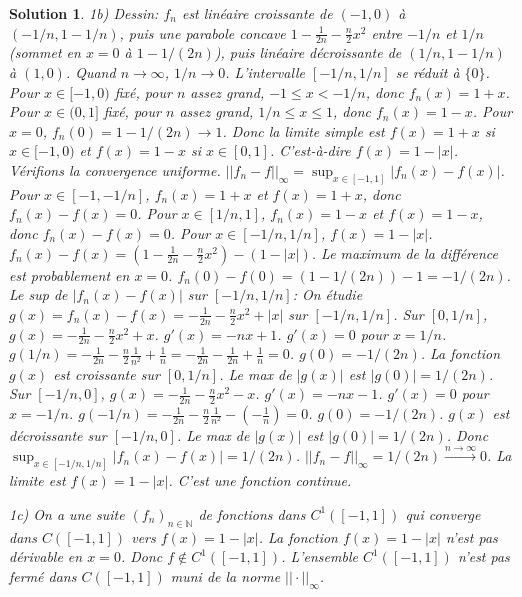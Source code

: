 \documentclass{article}
\newtheorem{solution}{Solution}
\begin{document}
\begin{solution}
1b) Dessin: $f_n$ est linéaire croissante de $(-1,0)$ à $(-1/n, 1-1/n)$, puis une parabole concave $1-\frac{1}{2n} - \frac{n}{2}x^2$ entre $-1/n$ et $1/n$ (sommet en $x=0$ à $1-1/(2n)$), puis linéaire décroissante de $(1/n, 1-1/n)$ à $(1,0)$. Quand $n \to \infty$, $1/n \to 0$. L'intervalle $[-1/n, 1/n]$ se réduit à $\{0\}$.
Pour $x \in [-1, 0)$ fixé, pour $n$ assez grand, $-1 \le x < -1/n$, donc $f_n(x) = 1+x$.
Pour $x \in (0, 1]$ fixé, pour $n$ assez grand, $1/n \le x \le 1$, donc $f_n(x) = 1-x$.
Pour $x=0$, $f_n(0) = 1 - 1/(2n) \to 1$.
Donc la limite simple est $f(x) = 1+x$ si $x \in [-1, 0)$ et $f(x)=1-x$ si $x \in [0, 1]$.
C'est-à-dire $f(x) = 1 - |x|$.
Vérifions la convergence uniforme. $||f_n - f||_\infty = \sup_{x \in [-1,1]} |f_n(x) - f(x)|$.
Pour $x \in [-1, -1/n]$, $f_n(x)=1+x$ et $f(x)=1+x$, donc $f_n(x)-f(x)=0$.
Pour $x \in [1/n, 1]$, $f_n(x)=1-x$ et $f(x)=1-x$, donc $f_n(x)-f(x)=0$.
Pour $x \in [-1/n, 1/n]$, $f(x)=1-|x|$.
$f_n(x) - f(x) = (1 - \frac{1}{2n} - \frac{n}{2} x^2) - (1 - |x|)$.
Le maximum de la différence est probablement en $x=0$.
$f_n(0) - f(0) = (1 - 1/(2n)) - 1 = -1/(2n)$.
Le sup de $|f_n(x) - f(x)|$ sur $[-1/n, 1/n]$:
On étudie $g(x) = f_n(x)-f(x) = -\frac{1}{2n} - \frac{n}{2}x^2 + |x|$ sur $[-1/n, 1/n]$.
Sur $[0, 1/n]$, $g(x) = -\frac{1}{2n} - \frac{n}{2}x^2 + x$. $g'(x) = -nx + 1$. $g'(x)=0$ pour $x=1/n$. $g(1/n) = -\frac{1}{2n} - \frac{n}{2}\frac{1}{n^2} + \frac{1}{n} = -\frac{1}{2n} - \frac{1}{2n} + \frac{1}{n} = 0$. $g(0) = -1/(2n)$. La fonction $g(x)$ est croissante sur $[0, 1/n]$. Le max de $|g(x)|$ est $|g(0)|=1/(2n)$.
Sur $[-1/n, 0]$, $g(x) = -\frac{1}{2n} - \frac{n}{2}x^2 - x$. $g'(x) = -nx - 1$. $g'(x)=0$ pour $x=-1/n$. $g(-1/n) = -\frac{1}{2n} - \frac{n}{2}\frac{1}{n^2} - (-\frac{1}{n}) = 0$. $g(0)=-1/(2n)$. $g(x)$ est décroissante sur $[-1/n, 0]$. Le max de $|g(x)|$ est $|g(0)|=1/(2n)$.
Donc $\sup_{x \in [-1/n, 1/n]} |f_n(x)-f(x)| = 1/(2n)$.
$||f_n - f||_\infty = 1/(2n) \xrightarrow{n \to \infty} 0$.
La limite est $f(x) = 1-|x|$. C'est une fonction continue.

1c) On a une suite $(f_n)_{n \in \mathbb{N}}$ de fonctions dans $C^1([-1, 1])$ qui converge dans $C([-1, 1])$ vers $f(x) = 1-|x|$.
La fonction $f(x)=1-|x|$ n'est pas dérivable en $x=0$. Donc $f \notin C^1([-1, 1])$.
L'ensemble $C^1([-1, 1])$ n'est pas fermé dans $C([-1, 1])$ muni de la norme $|| \cdot ||_\infty$.
\end{solution}
\end{document}
